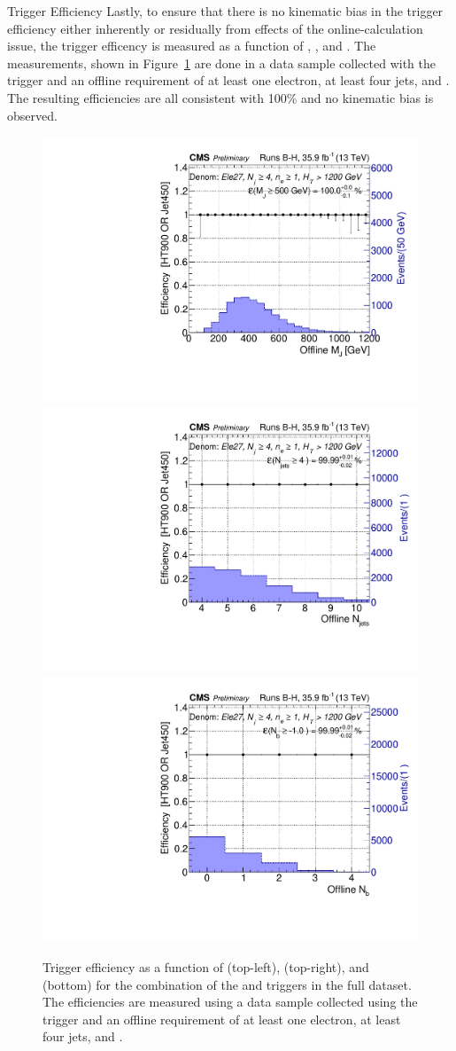 \begin{section}{Trigger Efficiency}
Lastly, to ensure that there is no kinematic bias in the trigger efficiency either inherently or residually from effects of the online-\HT calculation issue, the trigger efficency is measured as a function of \MJ, \Njets, and \Nb.
The measurements, shown in Figure~\ref{fig:kinvars_trigger} are done in a data sample collected with the \trigEle trigger and an offline requirement of at least one electron, at least four jets, and \baseHT.
The resulting efficiencies are all consistent with 100\% and no kinematic bias is observed.

\begin{figure}[tbp!]
\centering
\includegraphics[angle=0,width=0.45\columnwidth]{fig/trig_ht_jet_mj_runsbh.pdf}
\includegraphics[angle=0,width=0.45\columnwidth]{fig/trig_ht_jet_njets_runsbh.pdf}
\includegraphics[angle=0,width=0.45\columnwidth]{fig/trig_ht_jet_nb_runsbh.pdf}
\caption{Trigger efficiency as a function of \MJ (top-left), \Njets (top-right), and \Nb (bottom) for the combination of the \trigHT and \trigJet triggers in the full dataset.
The efficiencies are measured using a data sample collected using the \trigEle trigger and an offline requirement of at least one electron, at least four jets, and \baseHT.}
\label{fig:kinvars_trigger}
\end{figure}

\end{section}

